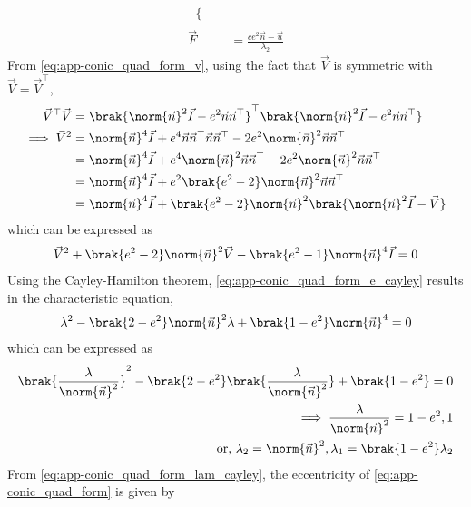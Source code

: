 \documentclass{article}
\numberwithin{equation}{section}
\numberwithin{figure}{section}
\begin{document}
\begin{enumerate}[label=\thesubsection.\arabic*.,ref=\thesubsection.\theenumi]
\begin{align}
\begin{split}
\begin{cases}
  \end{cases}
	\end{split}
  \\
  \label{eq:app-conic_quad_form_F} 
  \vec{F}  &= \frac{ce^2\vec{n}-\vec{u}}{\lambda_2}
\end{align}
	\label{app:conic-parameters}
	\solution
	From \eqref{eq:app-conic_quad_form_v}, using the fact that $\vec{V}$ is symmetric with $\vec{V} = \vec{V}^{\top}$,
  \begin{align}
	  \vec{V}^{\top} \vec{V}&=\brak{\norm{\vec{n}}^2\vec{I}-e^2\vec{n}\vec{n}^{\top}}^{\top}
	  \brak{\norm{\vec{n}}^2\vec{I}-e^2\vec{n}\vec{n}^{\top}}
    \\
	  \implies \vec{V}^{2} &= \norm{\vec{n}}^4\vec{I}+e^4\vec{n}\vec{n}^{\top}\vec{n}\vec{n}^{\top}
	  -2e^2\norm{\vec{n}}^2\vec{n}\vec{n}^{\top}
    \\
	  &= \norm{\vec{n}}^4\vec{I} + e^4\norm{\vec{n}}^2\vec{n}\vec{n}^{\top}
	  - 2e^2\norm{\vec{n}}^2\vec{n}\vec{n}^{\top}
    \\
	  &= \norm{\vec{n}}^4\vec{I} + e^2\brak{e^2 - 2}\norm{\vec{n}}^2\vec{n}\vec{n}^{\top}
    \\
	  &= \norm{\vec{n}}^4\vec{I} + \brak{e^2 - 2}\norm{\vec{n}}^2\brak{\norm{\vec{n}}^2\vec{I}- \vec{V}}
    \end{align}
%
which can be expressed as
\begin{align}
  \vec{V}^{2} + \brak{e^2 - 2}\norm{\vec{n}}^2\vec{V} - \brak{e^2 - 1}\norm{\vec{n}}^4\vec{I}=0
  \label{eq:app-conic_quad_form_e_cayley}
\end{align}
	Using the Cayley-Hamilton theorem,
	\eqref{eq:app-conic_quad_form_e_cayley} results in the characteristic equation, 
\begin{align}
  \lambda^{2} - \brak{2-e^2}\norm{\vec{n}}^2\lambda + \brak{1-e^2 }\norm{\vec{n}}^4=0
\end{align}
which can be expressed as
\begin{align}
\brak{\frac{\lambda}{\norm{\vec{n}}^2}}^2 - \brak{2-e^2 }\brak{\frac{\lambda}{\norm{\vec{n}}^2}}
	+ \brak{1-e^2 } = 0
	\\
	\implies \frac{\lambda}{\norm{\vec{n}}^2} = 1-e^2, 1
  \\
	\text{or, }\lambda_2 = \norm{\vec{n}}^2, \lambda_1 = \brak{1-e^2}\lambda_2 
  \label{eq:app-conic_quad_form_lam_cayley}
\end{align}
From   \eqref{eq:app-conic_quad_form_lam_cayley}, the eccentricity of \eqref{eq:app-conic_quad_form} is given by 

\end{enumerate}
\end{document}
